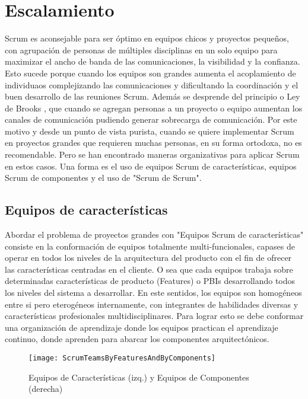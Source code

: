 \chapter{Escalamiento}

Scrum es aconsejable para ser óptimo en equipos chicos y proyectos pequeños, con agrupación de personas de múltiples disciplinas en un solo equipo para maximizar el ancho de banda de las comunicaciones, la visibilidad y la confianza. Esto sucede porque cuando los equipos son grandes aumenta el acoplamiento de individuaos complejizando las comunicaciones y dificultando la coordinación y el buen desarrollo de las reuniones Scrum. Además se desprende del principio o Ley de Brooks , que cuando se agregan personas a un proyecto o equipo aumentan los canales de comunicación pudiendo generar sobrecarga de comunicación. Por este motivo y desde un punto de vista purista, cuando se quiere implementar Scrum en proyectos grandes que requieren muchas personas, en su forma ortodoxa, no es recomendable. Pero se han encontrado maneras organizativas para aplicar Scrum en estos casos. Una forma es el uso de equipos Scrum de características, equipos Scrum de componentes y el uso de "Scrum de Scrum".

\section{Equipos de características}

Abordar el problema de proyectos grandes con "Equipos Scrum de características" consiste en la conformación de equipos totalmente multi-funcionales, capases de operar en todos los niveles de la arquitectura del producto con el fin de ofrecer las características centradas en el cliente. O sea que cada equipos trabaja sobre determinadas características de producto (Features) o PBIs desarrollando todos los niveles del sistema a desarrollar. En este sentidos, los equipos son homogéneos entre si pero eterogéneos internamente, con integrantes de habilidades diversas y características profesionales multidisciplinares. Para lograr esto se debe conformar una organización de aprendizaje donde los equipos practican el aprendizaje continuo, donde aprenden para abarcar los componentes arquitectónicos. 

\begin{figure}[h]
  \centering
  \texttt{[image: ScrumTeamsByFeaturesAndByComponents]}
  \caption{Equipos de Características (izq.) y Equipos de Componentes (derecha)}
  \centering
  \label{fig:ScrumTeamsByFeaturesAndByComponents} %
\end{figure}

